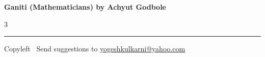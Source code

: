 \documentclass[8pt,landscape]{article}
\begin{document}
\raggedright
\footnotesize


\begin{center}
     \Large{\textbf{Ganiti (Mathematicians) by Achyut Godbole}}  %
\end{center}


\begin{multicols}{3}

\end{multicols}

\rule{\linewidth}{0.25pt}
\scriptsize
Copyleft \textcopyleft\  Send suggestions to 
\href{http://www.yogeshkulkarni.com}{yogeshkulkarni@yahoo.com}
\end{document}
